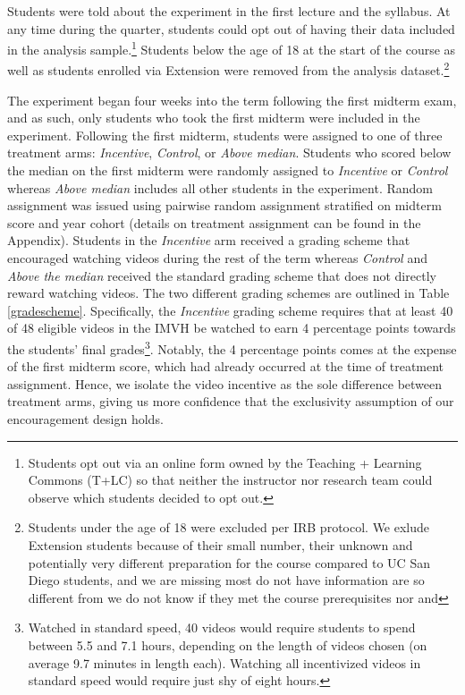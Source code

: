 \documentclass[12pt]{article}
\begin{document}
Students were told about the experiment in the first lecture and the syllabus. At any time during the quarter, students could opt out of having their data included in the analysis sample.\footnote{Students opt out via an online form owned by the Teaching + Learning Commons (T+LC) so that neither the instructor nor research team could observe which students decided to opt out.} Students below the age of 18 at the start of the course as well as students enrolled via Extension were removed from the analysis dataset.\footnote{Students under the age of 18 were excluded per IRB protocol. We exlude Extension students because of their small number, their unknown and potentially very different preparation for the course compared to UC San Diego students, and we are missing most do not have information are so different from we do not know if they met the course prerequisites nor and }

The experiment began four weeks into the term following the first midterm exam, and as such, only students who took the first midterm were included in the experiment. Following the first midterm, students were assigned to one of three treatment arms: \textit{Incentive}, \textit{Control}, or \textit{Above median}. Students who scored below the median on the first midterm were randomly assigned to \textit{Incentive} or \textit{Control} whereas \textit{Above median} includes all other students in the experiment. Random assignment was issued using pairwise random assignment stratified on midterm score and year cohort (details on treatment assignment can be found in the Appendix). Students in the \textit{Incentive} arm received a grading scheme that encouraged watching videos during the rest of the term whereas \textit{Control} and \textit{Above the median} received the standard grading scheme that does not directly reward watching videos. The two different grading schemes are outlined in Table \ref{gradescheme}. Specifically, the \textit{Incentive} grading scheme requires that at least 40 of 48 eligible videos in the IMVH be watched to earn 4 percentage points towards the students' final grades\footnote{Watched in standard speed, 40 videos would require students to spend between 5.5 and 7.1 hours, depending on the length of videos chosen (on average 9.7 minutes in length each). Watching all incentivized videos in standard speed would require just shy of eight hours.}.
Notably, the 4 percentage points comes at the expense of the first midterm score, which had already occurred at the time of treatment assignment. Hence, we isolate the video incentive as the sole difference between treatment arms, giving us more confidence that the exclusivity assumption of our encouragement design holds. %
\end{document}
